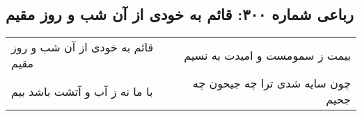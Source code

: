 \begin{center}
\section*{رباعی شماره ۳۰۰: قائم به خودی از آن شب و روز مقیم}
\label{sec:sh300}
\begin{longtable}{l p{0.5cm} r}
قائم به خودی از آن شب و روز مقیم
&&
بیمت ز سمومست و امیدت به نسیم
\\
با ما نه ز آب و آتشت باشد بیم
&&
چون سایه شدی ترا چه جیحون چه جحیم
\\
\end{longtable}
\end{center}
